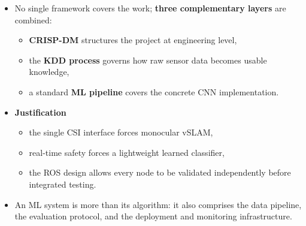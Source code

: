 {
	\begin{itemize}
		\item No single framework covers the work; \textbf{three complementary layers} are combined:
		\begin{itemize}
			\item \textbf{CRISP-DM} structures the project at engineering level,
			\item the \textbf{KDD process} governs how raw sensor data becomes usable knowledge,
			\item a standard \textbf{ML pipeline} covers the concrete CNN implementation.
		\end{itemize}
		\item \textbf{Justification}
		\begin{itemize}
			\item the single CSI interface forces monocular vSLAM,
			\item real-time safety forces a lightweight learned classifier,
			\item the ROS design allows every node to be validated independently before integrated testing.
		\end{itemize}
		\item An ML system is more than its algorithm: it also comprises the data pipeline, the evaluation protocol, and the deployment and monitoring infrastructure.
	\end{itemize}
}
